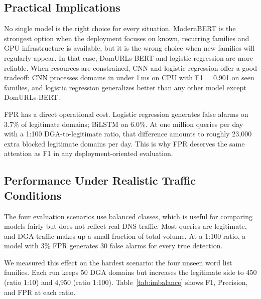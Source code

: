 \documentclass[conference]{IEEEtran}
\begin{document}
\subsection{Practical Implications}

No single model is the right choice for every situation. ModernBERT is the strongest option when the deployment focuses on known, recurring families and GPU infrastructure is available, but it is the wrong choice when new families will regularly appear. In that case, DomURLs-BERT and logistic regression are more reliable. When resources are constrained, CNN and logistic regression offer a good tradeoff: CNN processes domains in under 1\,ms on CPU with F1 = 0.901 on seen families, and logistic regression generalizes better than any other model except DomURLs-BERT.

FPR has a direct operational cost. Logistic regression generates false alarms on 3.7\% of legitimate domains; BiLSTM on 6.0\%. At one million queries per day with a 1:100 DGA-to-legitimate ratio, that difference amounts to roughly 23,000 extra blocked legitimate domains per day. This is why FPR deserves the same attention as F1 in any deployment-oriented evaluation.

\subsection{Performance Under Realistic Traffic Conditions}
\label{sec:imbalance}

The four evaluation scenarios use balanced classes, which is useful for comparing models fairly but does not reflect real DNS traffic. Most queries are legitimate, and DGA traffic makes up a small fraction of total volume. At a 1:100 ratio, a model with 3\% FPR generates 30 false alarms for every true detection.

We measured this effect on the hardest scenario: the four unseen word list families. Each run keeps 50 DGA domains but increases the legitimate side to 450 (ratio 1:10) and 4,950 (ratio 1:100). Table~\ref{tab:imbalance} shows F1, Precision, and FPR at each ratio.
\end{document}
